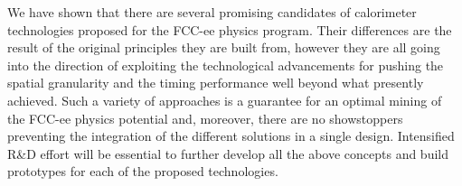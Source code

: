 We have shown that there are several promising candidates of calorimeter technologies proposed for the FCC-ee physics program. Their differences are the result of the original principles they are built from, however they are all going into the direction of exploiting the technological advancements for pushing the spatial granularity and the timing performance well beyond what presently achieved. Such a variety of approaches is a guarantee for an optimal mining of the FCC-ee physics potential and, moreover, there are no showstoppers preventing the integration of the different solutions in a single design. 
Intensified R\&{}D effort will be essential to further develop all the above concepts and build prototypes for each of the proposed technologies.

%
%
%





